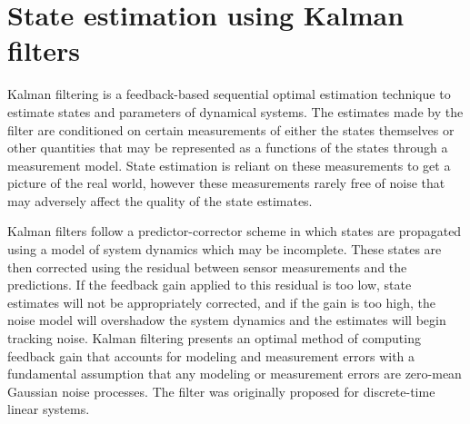 \section{State estimation using Kalman filters}

Kalman filtering is a feedback-based sequential optimal estimation technique \cite{kalman1960new} to estimate states and parameters of dynamical systems. The estimates made by the filter are conditioned on certain measurements of either the states themselves or other quantities that may be represented as a functions of the states through a measurement model. State estimation is reliant on these measurements to get a picture of the real world, however these measurements rarely free of noise that may adversely affect the quality of the state estimates. 

Kalman filters follow a predictor-corrector scheme in which states are propagated using a model of system dynamics which may be incomplete. These states are then corrected using the residual between sensor measurements and the predictions. If the feedback gain applied to this residual is too low, state estimates will not be appropriately corrected, and if the gain is too high, the noise model will overshadow the system dynamics and the estimates will begin tracking noise. Kalman filtering presents an optimal method of computing feedback gain that accounts for modeling and measurement errors with a fundamental assumption that any modeling or measurement errors are zero-mean Gaussian noise processes. The filter was originally proposed for discrete-time linear systems. 
 
